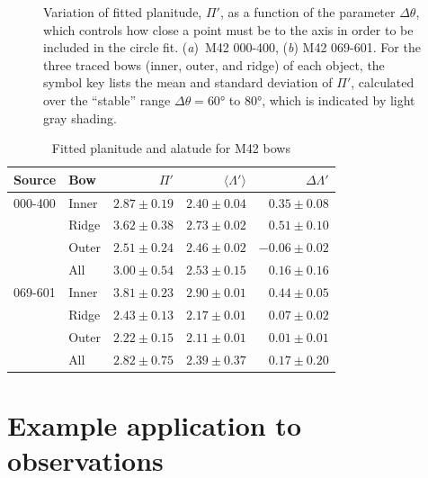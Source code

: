 \begin{figure}
\begin{tabular}{p{0.47\linewidth} p{0.47\linewidth}}
  \end{tabular}
  \caption[]{Variation of fitted planitude, \(\Pi'\), as a function of
    the parameter \(\Delta\theta\), which controls how close a point must be to
    the axis in order to be included in the circle
    fit. (\textit{a})~M42 000-400, (\textit{b}) M42 069-601.  For the
    three traced bows (inner, outer, and ridge) of each object, the
    symbol key lists the mean and standard deviation of \(\Pi'\),
    calculated over the ``stable'' range \(\Delta\theta = \ang{60}\) to
    \ang{80}, which is indicated by light gray shading.}
  \label{fig:000-400-Delta-theta}
\end{figure}

\begin{table}
  \caption[]{Fitted planitude and alatude for M42 bows}
  \label{tab:m42-fit}
  \centering
  \begin{tabular}{ll rrr}
    \toprule
    Source & Bow & \(\Pi'\) & \(\langle \Lambda' \rangle\)& \(\Delta\Lambda'\) \\
    \midrule
    000-400 & Inner & \(2.87 \pm 0.19\) & \(2.40 \pm 0.04\) & \(0.35 \pm 0.08\) \\
           &  Ridge & \(3.62 \pm 0.38\) & \(2.73 \pm 0.02\) & \(0.51 \pm 0.10\) \\
           & Outer & \(2.51 \pm 0.24\) & \(2.46 \pm 0.02\) & \(-0.06 \pm 0.02\) \\[\smallskipamount]
           & All & \(3.00 \pm 0.54\) & \(2.53 \pm 0.15\) & \(0.16 \pm 0.16\) \\[\bigskipamount]
    069-601 & Inner & \(3.81 \pm 0.23\) & \(2.90 \pm 0.01\) & \(0.44 \pm 0.05\) \\
           & Ridge & \(2.43 \pm 0.13\) & \(2.17 \pm 0.01\) & \(0.07 \pm 0.02\) \\
           & Outer & \(2.22 \pm 0.15\) & \(2.11 \pm 0.01\) & \(0.01 \pm 0.01\) \\[\smallskipamount]
           & All & \(2.82 \pm 0.75\) & \(2.39 \pm 0.37\) & \(0.17 \pm 0.20\)\\
    \bottomrule
  \end{tabular}
\end{table}

\section{Example application to observations}
\label{sec:obs}

